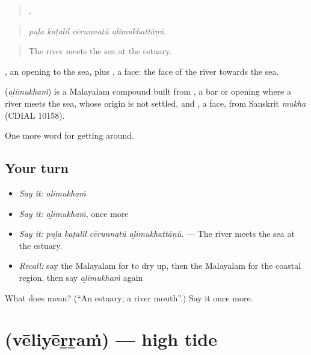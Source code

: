 \begin{quote}
   .
\end{quote}

\begin{quote}
\emph{puḻa kaṭalil cērunnatŭ aḻimukhattāṇŭ.}
\end{quote}

\begin{quote}
The river meets the sea at the estuary.
\end{quote}

, an opening to the sea, plus , a face: the face of the river towards the sea.

\begin{cousinweb}
\textbf{} (\emph{aḻimukhaṁ}) is a Malayalam compound built from , a bar or opening where a river meets the sea, whose origin is not settled, and , a face, from Sanskrit \emph{mukha} (CDIAL 10158).
\end{cousinweb}

\begin{grammarlens}[title={What you've built}]
One more word for getting around.
\end{grammarlens}

\subsection*{Your turn}
\begin{itemize}
\raggedright
  \item \emph{Say it:} \emph{aḻimukhaṁ}
  \item \emph{Say it:} \emph{aḻimukhaṁ}, once more
  \item \emph{Say it:} \emph{puḻa kaṭalil cērunnatŭ aḻimukhattāṇŭ.} — The river meets the sea at the estuary.
  \item \emph{Recall:} say the Malayalam for to dry up, then the Malayalam for the coastal region, then say \emph{aḻimukhaṁ} again
\end{itemize}

\begin{tcolorbox}[breakable,colback=teal!4,colframe=teal!35!black,title={Before you move on}]
What does  mean? (\textquotedblleft{}An estuary; a river mouth\textquotedblright{}.) Say it once more.
\end{tcolorbox}
\section[\texorpdfstring{\ml{വേലിയേറ്റം} (vēliyēṟṟaṁ)}{വേലിയേറ്റം (vēliyēṟṟaṁ)}]{ (vēliyēṟṟaṁ) — high tide}

